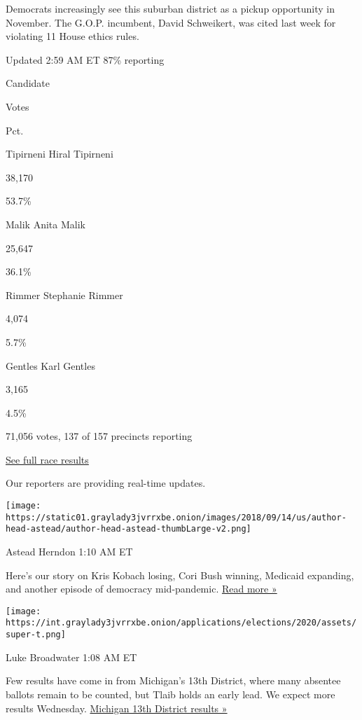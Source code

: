 Democrats increasingly see this suburban district as a pickup
opportunity in November. The G.O.P. incumbent, David Schweikert, was
cited last week for violating 11 House ethics rules.

Updated 2:59 AM ET 87\% reporting

Candidate

Votes

Pct.

 Tipirneni Hiral Tipirneni

38,170

53.7\%

 Malik Anita Malik

25,647

36.1\%

 Rimmer Stephanie Rimmer

4,074

5.7\%

 Gentles Karl Gentles

3,165

4.5\%

71,056 votes, 137 of 157 precincts reporting

\href{https://www.nytimes3xbfgragh.onion/interactive/2020/08/04/us/elections/results-arizona-house-district-6-primary-election.html}{See
full race results}

Our reporters are providing real-time updates.

\texttt{[image: https://static01.graylady3jvrrxbe.onion/images/2018/09/14/us/author-head-astead/author-head-astead-thumbLarge-v2.png]}

Astead Herndon 1:10 AM ET

Here's our story on Kris Kobach losing, Cori Bush winning, Medicaid
expanding, and another episode of democracy mid-pandemic.
\href{https://www.nytimes3xbfgragh.onion/2020/08/04/us/politics/kobach-tlaib.html?action=click\&module=ELEX_results\&pgtype=Interactive\&region=ReporterUpdates}{Read
more »}

\texttt{[image: https://int.graylady3jvrrxbe.onion/applications/elections/2020/assets/super-t.png]}

Luke Broadwater 1:08 AM ET

Few results have come in from Michigan's 13th District, where many
absentee ballots remain to be counted, but Tlaib holds an early lead. We
expect more results Wednesday.
\href{https://www.nytimes3xbfgragh.onion/interactive/2020/08/04/us/elections/results-michigan-house-district-13-primary-election.html?action=click\&module=ELEX_results\&pgtype=Interactive\&region=ReporterUpdates}{Michigan
13th District results »}

